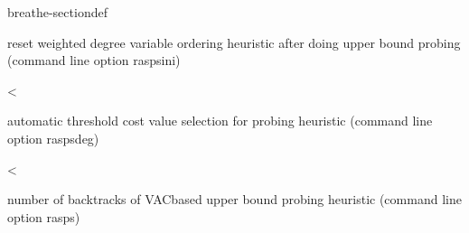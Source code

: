 \documentclass[letterpaper,10pt,openany,oneside,english]{sphinxmanual}
\begin{document}
\begin{fulllineitems}
\begin{sphinxuseclass}{breathe-sectiondef}
\begin{fulllineitems}
\sphinxAtStartPar
reset weighted degree variable ordering heuristic after doing upper bound probing (command line option \sphinxhyphen{}raspsini) 

\end{fulllineitems}


\begin{fulllineitems}
\label{\detokenize{ref/ref_cpp:_CPPv4N8ToulBar217RASPSnbBacktracksE}}\label{\detokenize{ref/ref_cpp:_CPPv3N8ToulBar217RASPSnbBacktracksE}}\label{\detokenize{ref/ref_cpp:_CPPv2N8ToulBar217RASPSnbBacktracksE}}\label{\detokenize{ref/ref_cpp:ToulBar2::RASPSnbBacktracks__Long}}
\pysigstartsignatures
\pysigstartmultiline
{}
\pysigstopmultiline
\pysigstopsignatures
\sphinxAtStartPar
\textless{} 

\sphinxAtStartPar
automatic threshold cost value selection for probing heuristic (command line option \sphinxhyphen{}raspsdeg) 

\end{fulllineitems}


\begin{fulllineitems}
\label{\detokenize{ref/ref_cpp:_CPPv4N8ToulBar224RASPSnbStrictACVariablesE}}\label{\detokenize{ref/ref_cpp:_CPPv3N8ToulBar224RASPSnbStrictACVariablesE}}\label{\detokenize{ref/ref_cpp:_CPPv2N8ToulBar224RASPSnbStrictACVariablesE}}\label{\detokenize{ref/ref_cpp:ToulBar2::RASPSnbStrictACVariables__i}}
\pysigstartsignatures
\pysigstartmultiline
{}
\pysigstopmultiline
\pysigstopsignatures
\sphinxAtStartPar
\textless{} 

\sphinxAtStartPar
number of backtracks of VAC\sphinxhyphen{}based upper bound probing heuristic (command line option \sphinxhyphen{}rasps) 


\end{fulllineitems}
\end{sphinxuseclass}
\end{fulllineitems}
\end{document}
